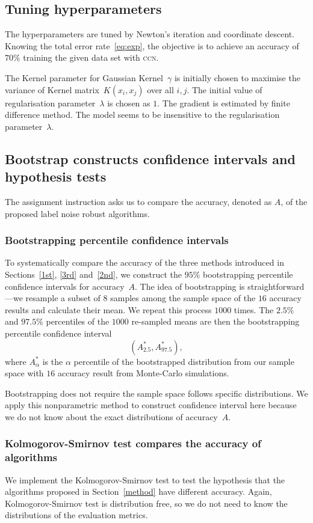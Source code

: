 \documentclass[12pt]{article} %
\begin{document}
\subsection{Tuning hyperparameters}
The hyperparameters are tuned by Newton's iteration and coordinate descent. Knowing the total error rate~\eqref{eq:exp}, the objective is to achieve an accuracy of $70\%$ training the given data set with \textsc{ccn}.

The Kernel parameter for Gaussian Kernel~$\gamma$ is initially chosen to maximise the variance of Kernel matrix~$K(x_i,x_j)$ over all $i,j$.
The initial value of regularisation parameter~$\lambda$ is chosen as $1$.
The gradient is estimated by finite difference method.
The model seems to be insensitive to the regularisation parameter~$\lambda$.

\subsection{Bootstrap constructs confidence intervals and hypothesis tests}
The assignment instruction asks us to compare the accuracy, denoted as $A$, of the proposed label noise robust algorithms.
\subsubsection{Bootstrapping percentile confidence intervals}\label{ci}
To systematically compare the accuracy of the three methods introduced in Sections~\ref{1st}, \ref{3rd} and~\ref{2nd}, we construct the $95\%$ bootstrapping percentile confidence intervals for accuracy~$A$. The idea of bootstrapping  is straightforward---we resample a subset of $8$ samples among the sample space of the $16$ accuracy results and calculate their mean. We repeat this process $1000$ times. The $2.5\%$ and $97.5\%$ percentiles of the $1000$ re-sampled means are then the bootstrapping percentile confidence interval
\begin{equation}
({A}^*_{2.5}, {A}^*_{97.5}), \label{eq:boot}
\end{equation}
where $A^*_{\alpha}$ is the $\alpha$ percentile of the bootstrapped distribution from our sample space with $16$ accuracy result from Monte-Carlo simulations.

Bootstrapping does not require the sample space follows specific distributions. We apply this nonparametric method to construct confidence interval here because we do not know about the exact distributions of accuracy~$A$.

\subsubsection{Kolmogorov-Smirnov test compares the accuracy of algorithms}\label{sec:ks}
We implement the Kolmogorov-Smirnov test to test the hypothesis that the algorithms proposed in Section~\ref{method} have different accuracy.  Again, Kolmogorov-Smirnov test is distribution free, so we do not need to know the distributions of the evaluation metrics.
\end{document}
